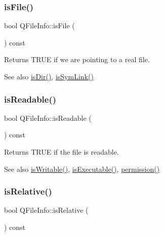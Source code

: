 \subsubsection{\texorpdfstring{isFile()}{isFile()}}
{\footnotesize\ttfamily bool Q\+File\+Info\+::is\+File (\begin{DoxyParamCaption}{ }\end{DoxyParamCaption}) const}

Returns T\+R\+UE if we are pointing to a real file. \begin{DoxySeeAlso}{See also}
\mbox{\hyperlink{class_q_file_info_a91a725dd517a4b77b15077e72a7a1501}{is\+Dir()}}, \mbox{\hyperlink{class_q_file_info_a0e8114893edbe9d471b6f1389add29fd}{is\+Sym\+Link()}} 
\end{DoxySeeAlso}
\mbox{\label{class_q_file_info_af8795a46c49f6911a14f66218949f213}} 
\subsubsection{\texorpdfstring{isReadable()}{isReadable()}}
{\footnotesize\ttfamily bool Q\+File\+Info\+::is\+Readable (\begin{DoxyParamCaption}{ }\end{DoxyParamCaption}) const}

Returns T\+R\+UE if the file is readable. \begin{DoxySeeAlso}{See also}
\mbox{\hyperlink{class_q_file_info_ab2dcfc1ea9764ea5e6ea9cc684156c92}{is\+Writable()}}, \mbox{\hyperlink{class_q_file_info_a5b834ba486c5f6da3b429751ee84fd12}{is\+Executable()}}, \mbox{\hyperlink{class_q_file_info_a51ec346b961f115fd7e45664d27862db}{permission()}} 
\end{DoxySeeAlso}
\mbox{\label{class_q_file_info_ae1b2d0ad6ca05510092d0182e276a5d0}} 
\subsubsection{\texorpdfstring{isRelative()}{isRelative()}}
{\footnotesize\ttfamily bool Q\+File\+Info\+::is\+Relative (\begin{DoxyParamCaption}{ }\end{DoxyParamCaption}) const}

